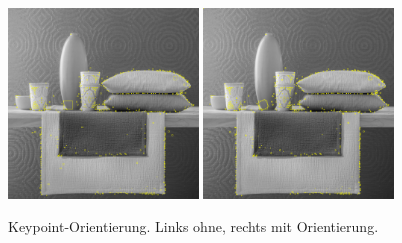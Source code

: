 \documentclass[a4paper,12pt]{scrartcl}
\begin{document}
% 
% 
% 
% 
% 
% 
% 
% 
% 
% 
% 

\begin{figure}[htbp]
  \centering
  \includegraphics[width=0.45\textwidth]{4RechteckemHkorrigiert} 
  \includegraphics[width=0.45\textwidth]{5RechteckOrientierung}  
  \caption{Keypoint-Orientierung. Links ohne, rechts mit Orientierung.}
  \label{Bild3}
\end{figure}
\end{document}
